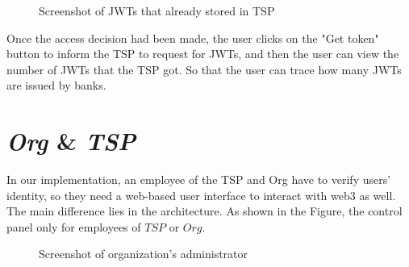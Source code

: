 \begin{figure}[htb]
    \centering
    \caption{{\footnotesize Screenshot of JWTs that already stored in TSP}}
    \label{fig:sreenshotJWT}
\end{figure}
Once the access decision had been made, the user clicks on the "Get token" button to inform the TSP to request for JWTs, and then the user can view the number of JWTs that the TSP got. So that the user can trace how many JWTs are issued by banks.

\section{\textit{Org} \& \textit{TSP}}
In our implementation, an employee of the TSP and Org have to verify users' identity, so they need a web-based user interface to interact with web3 as well. The main difference lies in the architecture. As shown in the Figure, the control panel only for employees of \(TSP\) or \(Org\).

\begin{figure}[htb]
    \centering
    \caption{{\footnotesize Screenshot of organization's administrator}}
    \label{fig:verifyID}
\end{figure}

